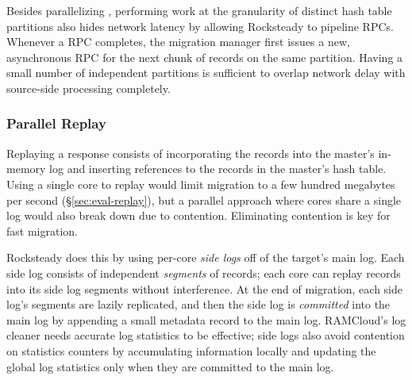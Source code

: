 Besides parallelizing \pulls, performing work at the granularity of distinct
hash table partitions also hides network latency by allowing Rocksteady to pipeline
RPCs.  Whenever a \pull RPC completes, the migration manager first issues a
new, asynchronous \pull RPC for the next chunk of records on the same
partition. Having a small number of independent partitions is sufficient to
overlap network delay with source-side \pull processing completely.

\subsubsection{Parallel Replay}

Replaying a \pull response consists of incorporating the records into
the master's in-memory log and inserting references to the records in the
master's hash table.  Using a single core to replay would limit migration to a
few hundred megabytes per second (\S\ref{sec:eval-replay}),  but a
parallel approach where
cores share a single log would also break down due to contention.  Eliminating
contention is key for fast migration.

Rocksteady does this by using per-core {\em side logs} off of the target's main
log. Each side log consists of independent {\em segments} of records; each core
can replay records into its side log segments without interference. At the end
of migration, each side log's segments are lazily replicated, and then the side
log is {\em committed} into the main log by appending a small metadata record
to the main log. RAMCloud's log cleaner needs accurate log statistics to be
effective; side logs also avoid contention on statistics counters by
accumulating information locally and updating the global log statistics
only when they are committed to the main log.

